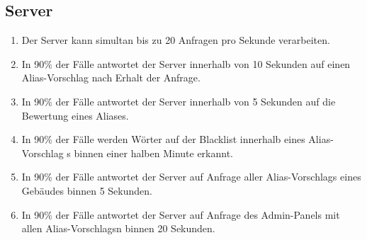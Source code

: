 \subsection{Server}

\begin{enumerate}
    \item Der \Gls{Server} kann \gls{simultan} bis zu 20 Anfragen pro Sekunde verarbeiten.
    \item In 90\% der Fälle antwortet der \Gls{Server} innerhalb von 10 Sekunden auf einen \Gls{Alias-Vorschlag} nach Erhalt der Anfrage.
    \item In 90\% der Fälle antwortet der \Gls{Server} innerhalb von 5 Sekunden auf die Bewertung eines Aliases.
    \item In 90\% der Fälle werden Wörter auf der \Gls{Blacklist} innerhalb eines \Gls{Alias-Vorschlag} s binnen einer halben Minute erkannt.
    \item In 90\% der Fälle antwortet der \Gls{Server} auf Anfrage aller \Glspl{Alias-Vorschlag} eines Gebäudes binnen 5 Sekunden.
    \item In 90\% der Fälle antwortet der \Gls{Server} auf Anfrage des \Gls{Admin-Panel}s mit allen \Glspl{Alias-Vorschlag}n binnen 20 Sekunden.
\end{enumerate}
